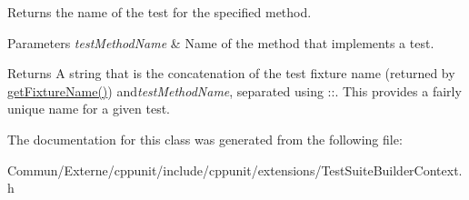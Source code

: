 Returns the name of the test for the specified method. 


\begin{DoxyParams}{Parameters}
{\em test\+Method\+Name} & Name of the method that implements a test. \\
\hline
\end{DoxyParams}
\begin{DoxyReturn}{Returns}
A string that is the concatenation of the test fixture name (returned by \hyperlink{class_test_suite_builder_context_base_abba530361ccd63ddf23fcbdc4f33727f}{get\+Fixture\+Name()}) and{\itshape test\+Method\+Name}, separated using \textquotesingle{}\+:\+:\textquotesingle{}. This provides a fairly unique name for a given test. 
\end{DoxyReturn}


The documentation for this class was generated from the following file\+:\begin{DoxyCompactItemize}
\item 
Commun/\+Externe/cppunit/include/cppunit/extensions/Test\+Suite\+Builder\+Context.\+h\end{DoxyCompactItemize}
